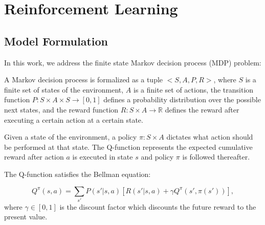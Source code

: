 
\chapter{Reinforcement Learning}
\label{ch:RL}
\section{Model Formulation}

In this work, we address the finite state Markov decision process (MDP) problem:
\begin{definition} A Markov decision process is formalized as a tuple $<S, A, P, R>$, where $S$ is a finite set of states of the environment, $A$ is
 a finite set of actions, the transition function $P:S \times A \times S \rightarrow [0, 1]$ defines a
 probability distribution over the possible next states, and the reward function $R:S \times A \rightarrow \mathbb{R}$ defines
 the reward after executing a certain action at a certain state.
\end{definition}

Given a state of the environment, a policy $\pi: S \times A$ dictates what action should be performed at that state. 
The Q-function represents the expected cumulative reward after action $a$ is executed in state $s$ and 
policy $\pi$ is followed thereafter.

The Q-function satisfies the Bellman equation:

\begin{equation}
    Q^{\pi}(s, a) = \sum_{s'}P(s'|s, a)[R(s'|s, a) + \gamma Q^{\pi}(s', \pi(s'))],
    \label{eq:Q}
\end{equation}
where $\gamma \in [0, 1]$ is the discount factor which discounts the future reward to the present value.


